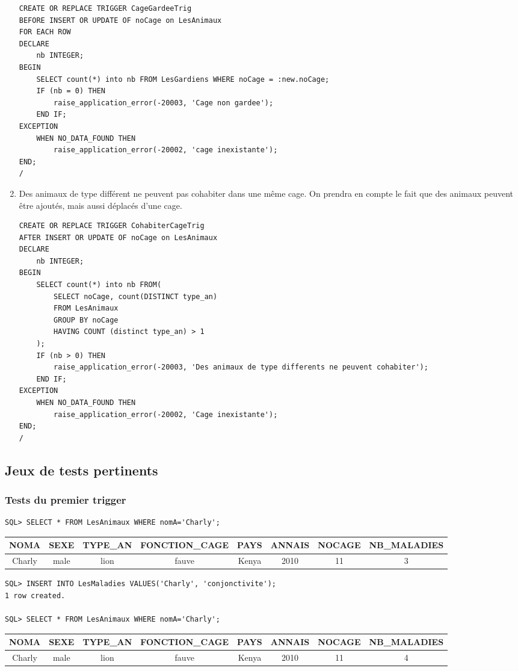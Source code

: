 \documentclass{article}
\begin{document}
\begin{enumerate}[label=\arabic*)]
\begin{lstlisting}
CREATE OR REPLACE TRIGGER CageGardeeTrig
BEFORE INSERT OR UPDATE OF noCage on LesAnimaux
FOR EACH ROW
DECLARE
	nb INTEGER;
BEGIN
	SELECT count(*) into nb FROM LesGardiens WHERE noCage = :new.noCage;
	IF (nb = 0) THEN
		raise_application_error(-20003, 'Cage non gardee');
	END IF;
EXCEPTION 
	WHEN NO_DATA_FOUND THEN
		raise_application_error(-20002, 'cage inexistante');
END;
/
\end{lstlisting}
	\item Des animaux de type différent ne peuvent pas cohabiter dans une même cage. On prendra en
compte le fait que des animaux peuvent être ajoutés, mais aussi déplacés d’une cage.
\begin{lstlisting}
CREATE OR REPLACE TRIGGER CohabiterCageTrig
AFTER INSERT OR UPDATE OF noCage on LesAnimaux
DECLARE
	nb INTEGER;
BEGIN
	SELECT count(*) into nb FROM(
		SELECT noCage, count(DISTINCT type_an)
		FROM LesAnimaux
		GROUP BY noCage
		HAVING COUNT (distinct type_an) > 1
	);
	IF (nb > 0) THEN
		raise_application_error(-20003, 'Des animaux de type differents ne peuvent cohabiter');
	END IF;
EXCEPTION 
	WHEN NO_DATA_FOUND THEN
		raise_application_error(-20002, 'Cage inexistante');
END;
/
\end{lstlisting}

\end{enumerate}

\subsection*{Jeux de tests pertinents}
\subsubsection*{Tests du premier trigger}
\lstset{frame=none}
\begin{lstlisting}
SQL> SELECT * FROM LesAnimaux WHERE nomA='Charly';
\end{lstlisting}
\begin{tabular}{|cccccccc|}
NOMA & SEXE & TYPE\_AN & FONCTION\_CAGE  & PAYS & ANNAIS & NOCAGE & NB\_MALADIES \\
\hline
Charly & male & lion & fauve & Kenya & 2010 & 11 & 3 \\
\end{tabular}

\begin{lstlisting}
SQL> INSERT INTO LesMaladies VALUES('Charly', 'conjonctivite');
1 row created.

SQL> SELECT * FROM LesAnimaux WHERE nomA='Charly';
\end{lstlisting}
\begin{tabular}{|cccccccc|}
NOMA & SEXE & TYPE\_AN & FONCTION\_CAGE  & PAYS & ANNAIS & NOCAGE & NB\_MALADIES \\
\hline
Charly & male & lion & fauve & Kenya & 2010 & 11 & 4 \\
\end{tabular}\\
\end{document}
